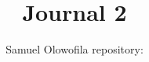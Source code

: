 \documentclass[12pt]{article}
\begin{document}
\title{Journal 2}
\author{Samuel Olowofila
repository: }
\date{}
\maketitle





\nocite{*}
\printbibliography[heading=none]


\nocite{*}
\printbibliography[heading=none]
\end{document}
